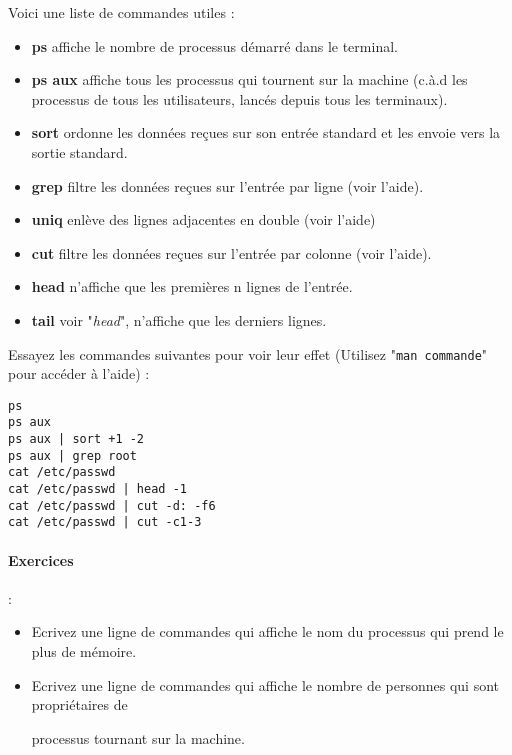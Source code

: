 \documentclass[12pt,a4paper]{article}
\begin{document}
Voici une liste de commandes utiles :
\begin{itemize}
\item \textbf{ps} affiche le nombre de processus démarré dans le
  terminal.
\item \textbf{ps aux} affiche tous les processus qui tournent sur la machine
  (c.à.d les processus de tous les utilisateurs, lancés depuis tous
  les terminaux).
\item \textbf{sort} ordonne les données reçues sur son entrée standard et les
  envoie vers la sortie standard.
\item \textbf{grep} filtre les données reçues sur l'entrée par ligne (voir
  l'aide).
\item \textbf{uniq} enlève des lignes adjacentes en double (voir l'aide)
\item \textbf{cut} filtre les données reçues sur l'entrée par colonne (voir
  l'aide).
\item \textbf{head} n'affiche que les premières n lignes de l'entrée.
\item \textbf{tail} voir "\textit{head}", n'affiche que les derniers lignes.
\end{itemize}

Essayez les commandes suivantes pour voir
leur effet (Utilisez "\texttt{man commande}" pour accéder à l'aide) :

\begin{verbatim}
ps 
ps aux 
ps aux | sort +1 -2 
ps aux | grep root
cat /etc/passwd 
cat /etc/passwd | head -1 
cat /etc/passwd | cut -d: -f6 
cat /etc/passwd | cut -c1-3
\end{verbatim}

\paragraph{Exercices} :
\begin{itemize}

\item Ecrivez une ligne de commandes qui affiche le nom du
  processus qui prend le plus de mémoire. 

\item Ecrivez une ligne de commandes
  qui affiche le nombre de personnes qui sont propriétaires de

  processus tournant sur la machine.
\end{itemize}
\end{document}
